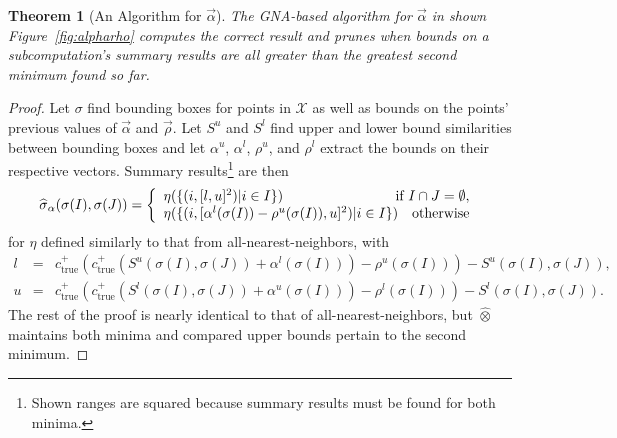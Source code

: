 \documentclass{article}
\newtheorem{theorem}{Theorem}
\newcommand{\killspace}{\vspace{-0.08in}}
\newcommand{\sigmahat}{\mathbin{\widehat{\sigma}}}
\newcommand{\otimeshat}{\mathbin{\widehat{\otimes}}}
\newcommand{\simhrectmin}{S^{l}}
\newcommand{\simhrectmax}{S^{u}}
\newcommand{\true}{\text{true}}
\newcommand{\ocpos}[1]{c^{+}_{#1}}
\newcommand{\vecrho}{\vec{\rho}}
\newcommand{\vecalpha}{\vec{\alpha}}
\newcommand{\falphamax}{\alpha^{u}}
\newcommand{\falphamin}{\alpha^{l}}
\newcommand{\frhomax}{\rho^{u}}
\newcommand{\frhomin}{\rho^{l}}
\begin{document}
\begin{theorem}[An Algorithm for $\vecalpha$]
  The GNA-based algorithm for $\vecalpha$ in shown
  Figure~\ref{fig:alpharho} computes the correct result and prunes
  when bounds on a subcomputation's summary results are all greater
  than the greatest second minimum found so far.
\end{theorem}
\killspace
\killspace
\begin{proof}
  Let $\sigma$ find bounding boxes for points in $\mathcal{X}$ as well as bounds on the points' previous values of $\vecalpha$ and $\vecrho$.
  Let $\simhrectmax$ and $\simhrectmin$ find upper and lower bound similarities
  between bounding boxes and let $\falphamax$, $\falphamin$, $\frhomax$, and
  $\frhomin$ extract the bounds on their respective vectors.  Summary results\footnote{Shown ranges are squared because summary results must be found for both minima.} are then
  \[
  \sigmahat_{\alpha}(\sigma(I),\sigma(J)) = \left\{ \begin{array}{lrr}
    \eta(\{(i,[l, u]^2) | i \in I\}) & \multicolumn{2}{r}{\mbox{if } I \cap J = \emptyset,} \\
    \multicolumn{2}{l}{\eta(\{(i,[\falphamin(\sigma(I)) - \frhomax(\sigma(I)), u]^2) | i \in I\})} & \mbox{otherwise}
  \end{array} \right. \\
  \]
  for $\eta$ defined similarly to that from all-nearest-neighbors, with
  \begin{eqnarray*}
    l & = & \ocpos{\true}(\ocpos{\true}(\simhrectmax(\sigma(I),\sigma(J)) + \falphamin(\sigma(I))) - \frhomax(\sigma(I))) - \simhrectmax(\sigma(I),\sigma(J)), \\
    u & = & \ocpos{\true}(\ocpos{\true}(\simhrectmin(\sigma(I),\sigma(J)) + \falphamax(\sigma(I))) - \frhomin(\sigma(I))) - \simhrectmin(\sigma(I),\sigma(J)).
  \end{eqnarray*}
  The rest of the proof is nearly identical to that of
  all-nearest-neighbors, but $\otimeshat$ maintains both minima and
  compared upper bounds pertain to the second minimum.
\end{proof}
\end{document}
